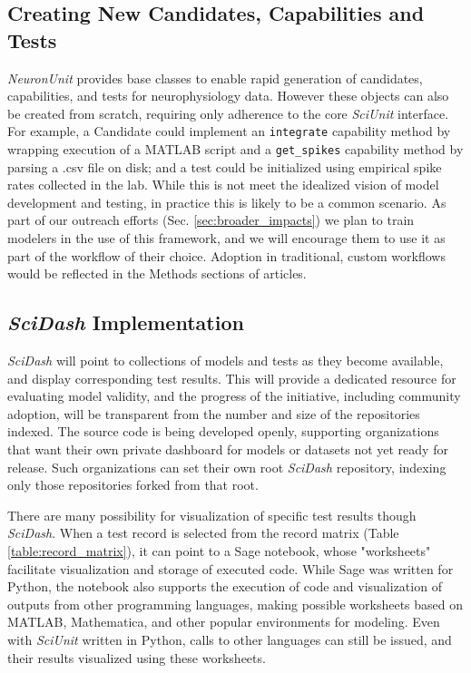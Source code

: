 \documentclass[11pt,letterpaper]{article}
\let\verbx\lstinline
\begin{document}
\subsection{Creating New Candidates, Capabilities and Tests}
\textit{NeuronUnit} provides base classes to enable rapid generation of candidates, capabilities, and tests for neurophysiology data.  However these objects can also be created from scratch, requiring only adherence to the core \textit{SciUnit} interface.  For example, a Candidate could implement an \verbx{integrate} capability method by wrapping execution of a MATLAB script and a \verbx{get_spikes} capability method by parsing a .csv file on disk; and a test could be initialized using empirical spike rates collected in the lab.  While this is not meet the idealized vision of model development and testing, in practice this is likely to be a common scenario.  As part of our outreach efforts (Sec. \ref{sec:broader_impacts}) we plan to train modelers in the use of this framework, and we will encourage them to use it as part of the workflow of their choice.  Adoption in traditional, custom workflows would be reflected in the Methods sections of articles.  

\subsection{\textit{SciDash} Implementation}
\textit{SciDash} will point to collections of models and tests as they become available, and display corresponding test results.  This will provide a dedicated resource for evaluating model validity, and the progress of the initiative, including community adoption, will be transparent from the number and size of the repositories indexed.  The source code is being developed openly\cite{scidash_portal_repo_url}, supporting organizations that want their own private dashboard for models or datasets not yet ready for release.  Such organizations can set their own root \textit{SciDash} repository, indexing only those repositories forked from that root.  

There are many possibility for visualization of specific test results though \textit{SciDash}.  When a test record is selected from the record matrix (Table \ref{table:record_matrix}), it can point to a Sage notebook\cite{sagenb_url}, whose "worksheets" facilitate visualization and storage of executed code.  While Sage was written for Python, the notebook also supports the execution of code and visualization of outputs from other programming languages, making possible worksheets based on MATLAB, Mathematica, and other popular environments for modeling.  Even with \textit{SciUnit} written in Python, calls to other languages can still be issued, and their results visualized using these worksheets.
\end{document}
